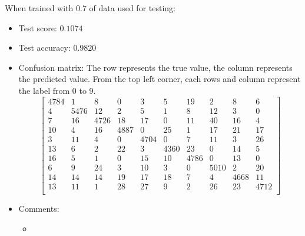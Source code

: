 \documentclass[paper=a4, fontsize=11pt]{scrartcl} %
\begin{document}
    When trained with 0.7 of data used for testing:
    \begin{itemize}
        \item Test score: $0.1074$
        \item Test accuracy: $0.9820$
        \item Confusion matrix: The row represents the true value, the column represents the predicted value. From the top left corner, each rows and column represent the label from 0 to 9.
        \[ \left[ \begin{array}{cccccccccc}
        4784 &    1 &    8 &    0 &    3 &    5 &   19 &    2 &    8 &    6 \\
           4 & 5476 &   12 &    2 &    5 &    1 &    8 &   12 &    3 &    0 \\
           7 &   16 & 4726 &   18 &   17 &    0 &   11 &   40 &   16 &    4 \\
          10 &    4 &   16 & 4887 &    0 &   25 &    1 &   17 &   21 &   17 \\
           3 &   11 &    4 &    0 & 4704 &    0 &    7 &   11 &    3 &   26 \\
          13 &    6 &    2 &   22 &    3 & 4360 &   23 &    0 &   14 &    5 \\
          16 &    5 &    1 &    0 &   15 &   10 & 4786 &    0 &   13 &    0 \\
           6 &    9 &   24 &    3 &   10 &    3 &    0 & 5010 &    2 &   20 \\
          14 &   14 &   14 &   19 &   17 &   18 &    7 &    4 & 4668 &   11 \\
          13 &   11 &    1 &   28 &   27 &    9 &    2 &   26 &   23 & 4712 \\
        \end{array} \right] \]
        \item Comments:
        \begin{itemize}
            \item
        \end{itemize}
    \end{itemize}
\end{document}
